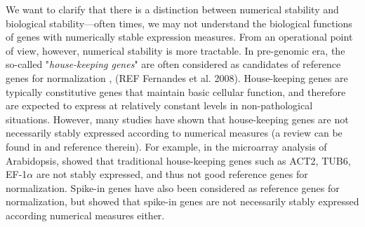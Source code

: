 \documentclass[letterpaper,12pt]{article}
\begin{document}
We want to clarify that there is a distinction between
numerical stability and biological stability---often times, we may not
understand the biological functions of genes with numerically stable
expression measures.  From an operational point of view, however, numerical
stability is more tractable. In pre-genomic era, the so-called "\textit{house-keeping
genes}" are often considered as candidates of reference genes for
normalization \citep{bustin2002quantification, andersen2004normalization},
(REF Fernandes et al.  2008). House-keeping
genes are typically constitutive genes that
maintain basic cellular function, and therefore are expected to express at
relatively constant levels in non-pathological situations.  However, many
studies have shown that house-keeping
genes are not necessarily stably expressed according to
numerical measures (a review can be found in \cite{huggett2005real} and
reference therein).  For example, in the microarray analysis of Arabidopsis, \cite{czechowski2005genome}
showed that traditional house-keeping
genes such as ACT2, TUB6, EF-1$\alpha$ are not stably
expressed, and thus not good reference genes for normalization.  Spike-in
genes have also been considered as reference genes for normalization, but
\cite{risso2014nat} showed that spike-in genes are not necessarily stably
expressed according numerical measures either.  
\end{document}
